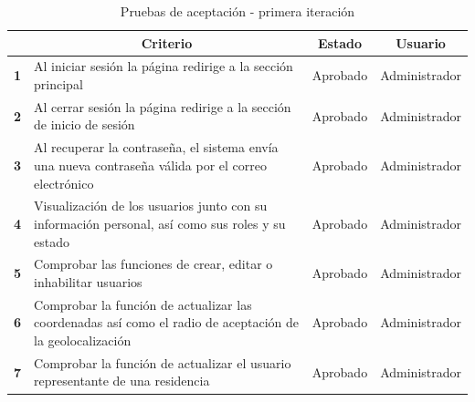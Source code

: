 \begin{spacing}{1}
    \begin{center}


    \renewcommand*{\arraystretch}{1.4}
    \begin{longtable}{ |>{\bfseries}l|p{}|l|l| }
        \caption{Pruebas de aceptación - primera iteración}\\
        \hline
        \multicolumn{1}{|c|}{ \textbf{N.}} & \multicolumn{1}{c|}{\textbf{Criterio}} & \multicolumn{1}{c|}{ \textbf{Estado}} & \multicolumn{1}{c|}{ \textbf{Usuario}}\\
        \hline
        1 & Al iniciar sesión la página redirige a la sección principal & Aprobado & Administrador\\
        \hline
        2 & Al cerrar sesión la página redirige a la sección de inicio de sesión & Aprobado & Administrador\\
        \hline
        3 & Al recuperar la contraseña, el sistema envía una nueva contraseña válida por el correo electrónico & Aprobado & Administrador\\
        \hline
        4 & Visualización de los usuarios junto con su información personal, así como sus roles y su estado & Aprobado & Administrador\\
        \hline
        5 & Comprobar las funciones de crear, editar o inhabilitar usuarios & Aprobado & Administrador\\
        \hline
        6 & Comprobar la función de actualizar las coordenadas así como el radio de aceptación de la geolocalización & Aprobado & Administrador\\
        \hline
        7 & Comprobar la función de actualizar el usuario representante de una residencia & Aprobado & Administrador\\
        \hline
    \end{longtable}\label{tab:pruebas-aceptacion-1}
    \end{center}
\end{spacing}

